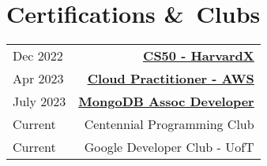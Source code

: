 
\section{Certifications \&\ Clubs}
\begin{tabular}{lr}
  Dec 2022  & \textbf{\underline{\href{https://certificates.cs50.io/5c64e9de-6da5-43d2-8e2d-f888535489b7.pdf?size=letter}{CS50 - HarvardX}}}             \\
  Apr 2023  & \textbf{\underline{\href{https://www.credly.com/badges/94d2934f-5383-4e1c-a55e-47515c806f7f/linked_in_profile}{Cloud Practitioner - AWS}}} \\
  July 2023 & \textbf{\underline{\href{https://www.credly.com/badges/21d50060-794b-4d25-b926-20b19de12ebe/linked_in_profile}{MongoDB Assoc Developer}}}  \\
  Current   & Centennial Programming Club                                                                                                                \\
  Current   & Google Developer Club - UofT
\end{tabular}
\sectionsep